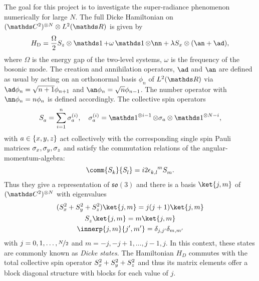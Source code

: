 The goal for this project is to investigate the super-radiance phenomenon numerically for large \(N\).
The full Dicke Hamiltonian on \((\C^2)^{\otimes N} \otimes \Ltwo{\R}\) is given by
\begin{equation}\label{eq:dicke-hamiltonian}
    H_{\mathrm{D}} = \frac{\Omega}{2} \SZ \otimes \one + \omega \one \otimes \nn + \lambda \SX \otimes \of*{\an + \ad}
    ,
\end{equation}
where \(\Omega\) is the energy gap of the two-level systems, \(\omega\) is the frequency of the bosonic mode.
The creation and annihilation operators, \(\ad\) and \(\an\) are defined as usual by acting on an orthonormal basis \(\phi_n\) of \(\Ltwo{\R}\) via \(\ad\phi_n = \sqrt{n+1} \phi_{n+1}\) and \(\an\phi_n = \sqrt{n}\phi_{n-1}\).
The number operator with \(\nn \phi_n = n \phi_n\) is defined accordingly.
The collective spin operators 
\begin{gather}
	\s{}_{a} = \sum_{i = 1}^n \pauliI{a}{i}, \quad \pauliI{a}{i} = \one^{\otimes i-1}\otimes \pauli{a}\otimes \one^{\otimes N-i}
    ,
\end{gather}
with \(a \in \{x,y,z\}\) act collectively with the corresponding single spin Pauli matrices \(\sigma_{x},\sigma_{y},\sigma_{z}\) and satisfy the commutation relations of the angular-momentum-algebra:
\begin{equation}\label{eq:angular-momentum-algebra}
	\comm{\s{}_k}{\s{}_l} = i2\tensor{\epsilon}{_{k,l}^{m}}\s{}_m
    .
\end{equation}
Thus they give a representation of \(\mathfrak{so}(3)\) and there is a basis \(\ket{j,m}\) of \((\C^2)^{\otimes N}\) with eigenvalues
\begin{gather}
	\label{eq:dicke-states-total-spin}
	(\SX^2 + \SY^2 + \SZ^2)\ket{j,m} = j(j+1)\ket{j,m}
	\\
	\label{eq:dicke-states-magnetic-number}
	\s{}_z\ket{j,m} = m\ket{j,m}
	\\
	\label{eq:dicke-states-orthonormal}
	\innerp{j,m}{j\primed,m\primed} = \delta_{j,j\primed}\delta_{m,m\primed}
\end{gather}
with \(j = 0,1,\dots, \nicefrac{N}{2}\) and \(m = -j,-j+1, \dots,j-1, j\).
In this context, these states are commonly known as \emph{Dicke states}.
The Hamiltonian \(H_D\) commutes with the total collective spin operator \(S_x^2 + S_y^2 + S_z^2\) and thus its matrix elements offer a block diagonal structure with blocks for each value of \(j\).

